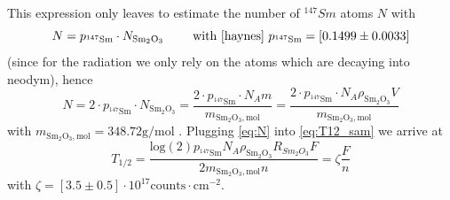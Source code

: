 This expression only leaves to estimate the number of $^{147}Sm$ atoms $N$ with
\begin{equation}
    N = p_{\mathrm{^{147}Sm}} \cdot N_{\mathrm{Sm_2O_3}} 
    \qquad \text{ with \cite{haynes} } p_{\mathrm{^{147}Sm}}= [0.1499\pm0.0033]
\end{equation}
(since for the radiation we only
rely on the atoms which are decaying into neodym), hence
\begin{equation}
    N = 2 \cdot p_{\mathrm{^{147}Sm}} \cdot N_{\mathrm{Sm_2O_3}} 
    = \frac{2 \cdot p_{\mathrm{^{147}Sm}} \cdot N_A m}{m_{\mathrm{Sm_2O_3, mol}}}
    = \frac{2 \cdot p_{\mathrm{^{147}Sm}} \cdot N_A \rho_{\mathrm{Sm_2O_3}} V}{m_{\mathrm{Sm_2O_3, mol}}}
    \label{eq:N}
\end{equation}
with $m_{\mathrm{Sm_2O_3, mol}} = 348.72 \mathrm{g/mol} $ \cite{haynes}. 
Plugging \eqref{eq:N} into \eqref{eq:T12_sam} we arrive at
\begin{equation}
T_{1/2} = \frac{\mathrm{log}(2)p_{\mathrm{^{147}Sm}} 
 N_A \rho_{\mathrm{Sm_2O_3}}R_{Sm_2O_3}F}{2m_{\mathrm{Sm_2O_3, mol}}n } = \zeta \frac{F}{n} 
\label{eq:T12_sam}
\end{equation}
with $\zeta=[3.5\pm0.5]\cdot10^{17} \mathrm{counts \cdot cm^{-2}}$.

